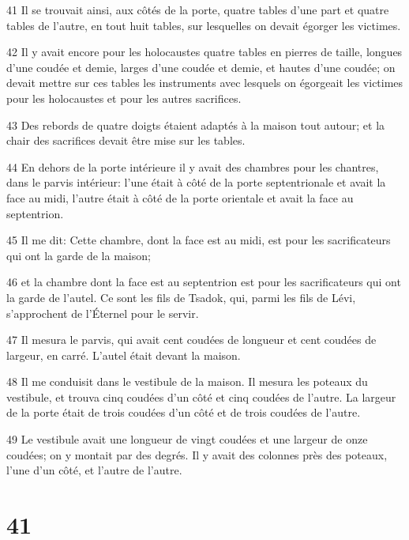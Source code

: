 \par 41 Il se trouvait ainsi, aux côtés de la porte, quatre tables d'une part et quatre tables de l'autre, en tout huit tables, sur lesquelles on devait égorger les victimes.
\par 42 Il y avait encore pour les holocaustes quatre tables en pierres de taille, longues d'une coudée et demie, larges d'une coudée et demie, et hautes d'une coudée; on devait mettre sur ces tables les instruments avec lesquels on égorgeait les victimes pour les holocaustes et pour les autres sacrifices.
\par 43 Des rebords de quatre doigts étaient adaptés à la maison tout autour; et la chair des sacrifices devait être mise sur les tables.
\par 44 En dehors de la porte intérieure il y avait des chambres pour les chantres, dans le parvis intérieur: l'une était à côté de la porte septentrionale et avait la face au midi, l'autre était à côté de la porte orientale et avait la face au septentrion.
\par 45 Il me dit: Cette chambre, dont la face est au midi, est pour les sacrificateurs qui ont la garde de la maison;
\par 46 et la chambre dont la face est au septentrion est pour les sacrificateurs qui ont la garde de l'autel. Ce sont les fils de Tsadok, qui, parmi les fils de Lévi, s'approchent de l'Éternel pour le servir.
\par 47 Il mesura le parvis, qui avait cent coudées de longueur et cent coudées de largeur, en carré. L'autel était devant la maison.
\par 48 Il me conduisit dans le vestibule de la maison. Il mesura les poteaux du vestibule, et trouva cinq coudées d'un côté et cinq coudées de l'autre. La largeur de la porte était de trois coudées d'un côté et de trois coudées de l'autre.
\par 49 Le vestibule avait une longueur de vingt coudées et une largeur de onze coudées; on y montait par des degrés. Il y avait des colonnes près des poteaux, l'une d'un côté, et l'autre de l'autre.

\chapter{41}

